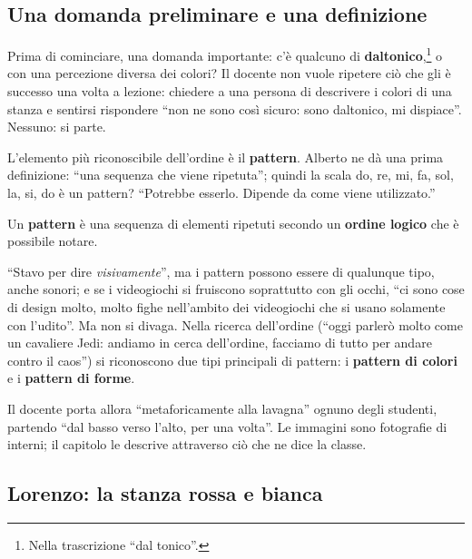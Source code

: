 

\subsection{Una domanda preliminare e una definizione}

Prima di cominciare, una domanda importante: c'è qualcuno di
\textbf{daltonico},\footnote{Nella trascrizione ``dal tonico''.} o con una percezione
diversa dei colori? Il docente non vuole ripetere ciò che gli è successo una volta a
lezione: chiedere a una persona di descrivere i colori di una stanza e sentirsi
rispondere ``non ne sono così sicuro: sono daltonico, mi dispiace''. Nessuno: si parte.

L'elemento più riconoscibile dell'ordine è il \textbf{pattern}. Alberto ne dà una prima
definizione: ``una sequenza che viene ripetuta''; quindi la scala do, re, mi, fa, sol,
la, si, do è un pattern? ``Potrebbe esserlo. Dipende da come viene utilizzato.''

\begin{definition}[Pattern]
Un \textbf{pattern} è una sequenza di elementi ripetuti secondo un \textbf{ordine
logico} che è possibile notare.
\end{definition}

``Stavo per dire \emph{visivamente}'', ma i pattern possono essere di qualunque tipo,
anche sonori; e se i videogiochi si fruiscono soprattutto con gli occhi, ``ci sono
cose di design molto, molto fighe nell'ambito dei videogiochi che si usano solamente
con l'udito''. Ma non si divaga. Nella ricerca dell'ordine (``oggi parlerò molto come
un cavaliere Jedi: andiamo in cerca dell'ordine, facciamo di tutto per andare contro il
caos'') si riconoscono due tipi principali di pattern: i \textbf{pattern di colori} e
i \textbf{pattern di forme}.

Il docente porta allora ``metaforicamente alla lavagna'' ognuno degli studenti,
partendo ``dal basso verso l'alto, per una volta''. Le immagini sono fotografie di
interni; il capitolo le descrive attraverso ciò che ne dice la classe.

\subsection{Lorenzo: la stanza rossa e bianca}

